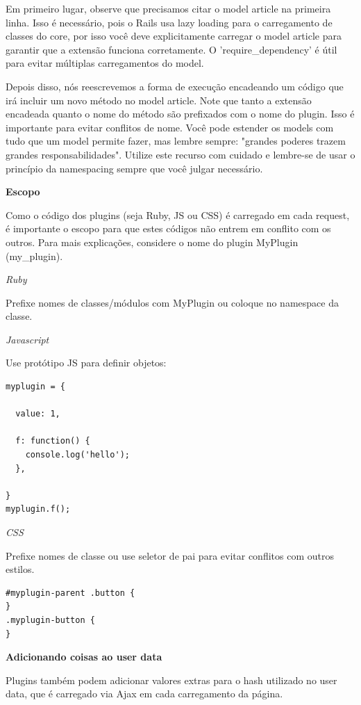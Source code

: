 \documentclass[11pt]{article}
\begin{document}
Em primeiro lugar, observe que precisamos citar o model article na primeira
linha. Isso é necessário, pois o Rails usa lazy loading para o carregamento
de classes do core, por isso você deve explicitamente carregar o model article para
garantir que a extensão funciona corretamente. O 'require\_dependency' é útil
para evitar múltiplas carregamentos do model.

Depois disso, nós reescrevemos a forma de execução encadeando um código que
irá incluir um novo método no model article. Note que tanto a extensão
encadeada quanto o nome do método são prefixados com o nome do plugin. Isso é
importante para evitar conflitos de nome. Você pode estender os models com
tudo que um model permite fazer, mas lembre sempre: "grandes poderes trazem
grandes responsabilidades". Utilize este recurso com cuidado e lembre-se de
usar o princípio da namespacing sempre que você julgar necessário.

{\bf Escopo}

Como o código dos plugins (seja Ruby, JS ou CSS) é carregado em cada request,
é importante o escopo para que estes códigos não entrem em conflito com os
outros. Para mais explicações, considere o nome do plugin MyPlugin
(my\_plugin).

{\it Ruby}

Prefixe nomes de classes/módulos com MyPlugin ou coloque no namespace da classe.

{\it Javascript}

Use protótipo JS para definir objetos:
\begin{Verbatim}[frame=single,fontfamily=courier]
myplugin = {

  value: 1,

  f: function() {
    console.log('hello');
  },

}
myplugin.f();
\end{Verbatim}

{\it CSS}

Prefixe nomes de classe ou use seletor de pai para evitar conflitos com outros
estilos.

\begin{Verbatim}[frame=single,fontfamily=courier]
#myplugin-parent .button {
}
.myplugin-button {
}
\end{Verbatim}

{\bf Adicionando coisas ao user data}

Plugins também podem adicionar valores extras para o hash utilizado no user
data, que é carregado via Ajax em cada carregamento da página.
\end{document}
